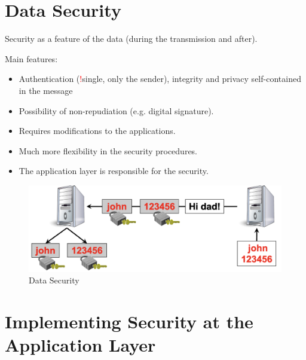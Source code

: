\section{Data Security}
\begin{center}
    Security as a feature of the data (during the transmission and after).
\end{center}

\begin{multicols}{2}
    Main features:
    \begin{itemize}
        \item Authentication (\textcolor{Red}{!}single, only the sender), integrity and privacy self-contained in the message
        \item Possibility of non-repudiation (e.g. digital signature).
        \item Requires modifications to the applications.
        \item Much more flexibility in the security procedures.
        \item The application layer is responsible for the security.
    \end{itemize}

\columnbreak

\begin{figure}[H]
    \centering
    \includegraphics[width=\linewidth]{Images/Appsec/data_security.png}
    \caption{Data Security}
\end{figure}
\end{multicols}


\section{Implementing Security at the Application Layer}

